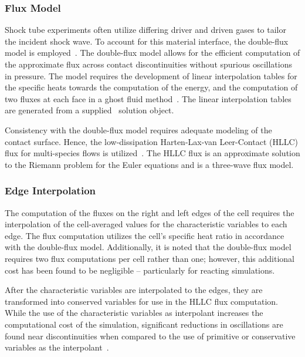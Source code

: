 \subsubsection{Flux Model}

Shock tube experiments often utilize differing driver and driven gases to tailor the incident shock wave. To account for this material interface, the double-flux model is employed~\cite{ABGRALL_JCP1996,ABGRALL_KARNI_JCP2001,BILLET_ABGRALL_JCP2003}. The double-flux model allows for the efficient computation of the approximate flux across contact discontinuities without spurious oscillations in pressure. The model requires the development of linear interpolation tables for the specific heats towards the computation of the energy, and the computation of two fluxes at each face in a ghost fluid method~\cite{GROGAN_THESIS18}. The linear interpolation tables are generated from a supplied \cantera\ solution object.

Consistency with the double-flux model requires adequate modeling of the contact surface. Hence, the low-dissipation Harten-Lax-van Leer-Contact (HLLC) flux for multi-species flows is utilized~\cite{TORO_BOOK,GROGAN_THESIS18}. The HLLC flux is an approximate solution to the Riemann problem for the Euler equations and is a three-wave flux model.
\subsubsection{Edge Interpolation}
The computation of the fluxes on the right and left edges of the cell requires the interpolation of the cell-averaged values for the characteristic variables to each edge. The flux computation utilizes the cell's specific heat ratio in accordance with the double-flux model. Additionally, it is noted that the double-flux model requires two flux computations per cell rather than one; however, this additional cost has been found to be negligible -- particularly for reacting simulations. 

After the characteristic variables are interpolated to the edges, they are transformed into conserved variables for use in the HLLC flux computation. While the use of the characteristic variables as interpolant increases the computational cost of the simulation, significant reductions in oscillations are found near discontinuities when compared to the use of primitive or conservative variables as the interpolant~\cite{HOUIM_KUO_JCP_2011}. 



